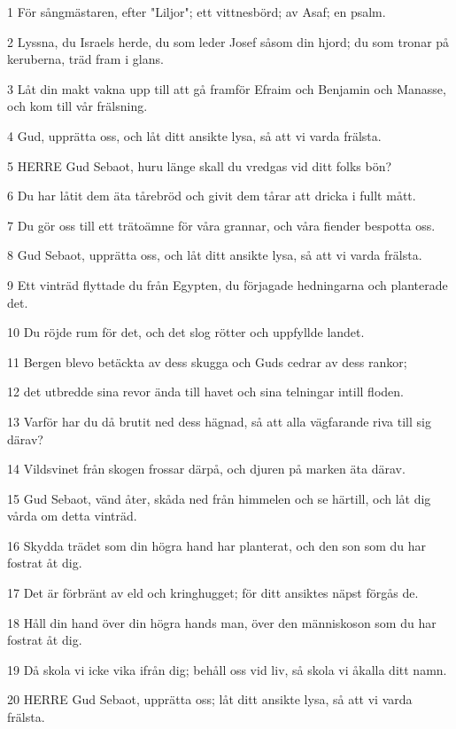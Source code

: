 \par 1 För sångmästaren, efter "Liljor"; ett vittnesbörd; av Asaf; en psalm.
\par 2 Lyssna, du Israels herde, du som leder Josef såsom din hjord; du som tronar på keruberna, träd fram i glans.
\par 3 Låt din makt vakna upp till att gå framför Efraim och Benjamin och Manasse, och kom till vår frälsning.
\par 4 Gud, upprätta oss, och låt ditt ansikte lysa, så att vi varda frälsta.
\par 5 HERRE Gud Sebaot, huru länge skall du vredgas vid ditt folks bön?
\par 6 Du har låtit dem äta tårebröd och givit dem tårar att dricka i fullt mått.
\par 7 Du gör oss till ett trätoämne för våra grannar, och våra fiender bespotta oss.
\par 8 Gud Sebaot, upprätta oss, och låt ditt ansikte lysa, så att vi varda frälsta.
\par 9 Ett vinträd flyttade du från Egypten, du förjagade hedningarna och planterade det.
\par 10 Du röjde rum för det, och det slog rötter och uppfyllde landet.
\par 11 Bergen blevo betäckta av dess skugga och Guds cedrar av dess rankor;
\par 12 det utbredde sina revor ända till havet och sina telningar intill floden.
\par 13 Varför har du då brutit ned dess hägnad, så att alla vägfarande riva till sig därav?
\par 14 Vildsvinet från skogen frossar därpå, och djuren på marken äta därav.
\par 15 Gud Sebaot, vänd åter, skåda ned från himmelen och se härtill, och låt dig vårda om detta vinträd.
\par 16 Skydda trädet som din högra hand har planterat, och den son som du har fostrat åt dig.
\par 17 Det är förbränt av eld och kringhugget; för ditt ansiktes näpst förgås de.
\par 18 Håll din hand över din högra hands man, över den människoson som du har fostrat åt dig.
\par 19 Då skola vi icke vika ifrån dig; behåll oss vid liv, så skola vi åkalla ditt namn.
\par 20 HERRE Gud Sebaot, upprätta oss; låt ditt ansikte lysa, så att vi varda frälsta.

